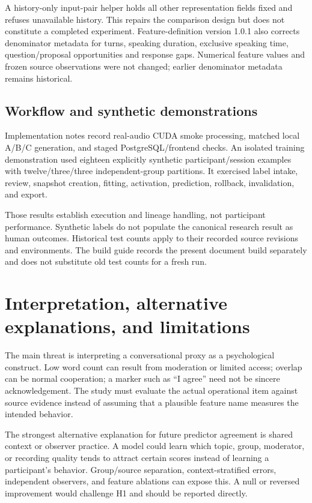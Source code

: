 \documentclass{article}
\begin{document}
A history-only input-pair helper holds all other representation fields fixed and refuses unavailable history. This repairs the comparison design but does not constitute a completed experiment. Feature-definition version 1.0.1 also corrects denominator metadata for turns, speaking duration, exclusive speaking time, question/proposal opportunities and response gaps. Numerical feature values and frozen source observations were not changed; earlier denominator metadata remains historical.

\subsection{Workflow and synthetic demonstrations}
Implementation notes record real-audio CUDA smoke processing, matched local A/B/C generation, and staged PostgreSQL/frontend checks. An isolated training demonstration used eighteen explicitly synthetic participant/session examples with twelve/three/three independent-group partitions. It exercised label intake, review, snapshot creation, fitting, activation, prediction, rollback, invalidation, and export.

Those results establish execution and lineage handling, not participant performance. Synthetic labels do not populate the canonical research result as human outcomes. Historical test counts apply to their recorded source revisions and environments. The build guide records the present document build separately and does not substitute old test counts for a fresh run.

\section{Interpretation, alternative explanations, and limitations}
The main threat is interpreting a conversational proxy as a psychological construct. Low word count can result from moderation or limited access; overlap can be normal cooperation; a marker such as ``I agree'' need not be sincere acknowledgement. The study must evaluate the actual operational item against source evidence instead of assuming that a plausible feature name measures the intended behavior.

The strongest alternative explanation for future predictor agreement is shared context or observer practice. A model could learn which topic, group, moderator, or recording quality tends to attract certain scores instead of learning a participant's behavior. Group/source separation, context-stratified errors, independent observers, and feature ablations can expose this. A null or reversed improvement would challenge H1 and should be reported directly.
\end{document}
